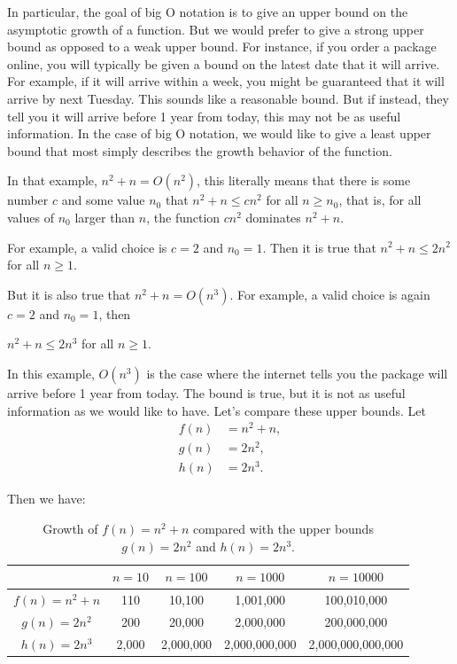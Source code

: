 In particular, the goal of big O notation is to give an upper bound on the asymptotic growth of a function.  
But we would prefer to give a strong upper bound as opposed to a weak upper bound.
For instance, if you order a package online, you will typically be given a bound on the latest date that it will arrive.  For example, if it will arrive within a week, you might be guaranteed that it will arrive by next Tuesday.  This sounds like a reasonable bound.  But if instead, they tell you it will arrive before 1 year from today, this may not be as useful information.
In the case of big O notation, we would like to give a least upper bound that most simply describes the growth behavior of the function.

In that example,  
$n^2 + n = O(n^2)$, this literally means that 
there is some number $c$ and some value $n_0$ that 
$n^2 + n \leq c n^2$ for all $n \geq n_0$, 
that is, for all values of $n_0$ larger than $n$, the function $c n^2$ dominates $n^2 + n$.  

For example, a valid choice is $c = 2$ and $n_0 = 1$.  Then it is true that 
$n^2 + n \leq 2 n^2$ for all $n \geq 1$.

But it is also true that $n^2 + n = O(n^3)$.  For example, a valid choice is again $c = 2$ and $n_0 = 1$, then 

$n^2 + n \leq 2 n^3$ for all $n \geq 1$.

In this example, $O(n^3)$ is the case where the internet tells you the package will arrive before 1 year from today.    The bound is true, but it is not as useful information as we would like to have.
Let's compare these upper bounds.  
Let 
\begin{align*}
f(n) &= n^2 + n, \\
g(n) &= 2n^2, \\
h(n) &= 2n^3.
\end{align*}

Then we have:
\begin{table}[h]
    \centering
    \begin{tabular}{|c|c|c|c|c|}
        \hline
                  & $n = 10$   & $n = 100$  & $n = 1000$   & $n = 10000$ \\
        \hline
        $f(n)=n^2 + n$    & 110        & 10,100     & 1,001,000    & 100,010,000 \\
        \hline
        $g(n)= 2n^2$    & 200        & 20,000     & 2,000,000    & 200,000,000 \\
        \hline
        $h(n)= 2n^3$    & 2,000      & 2,000,000  & 2,000,000,000 & 2,000,000,000,000 \\
        \hline
    \end{tabular}
\caption{Growth of $f(n)=n^2+n$ compared with the upper bounds $g(n)=2n^2$ and $h(n)=2n^3$.}\label{tab:complexity-tab01}%
\end{table}

